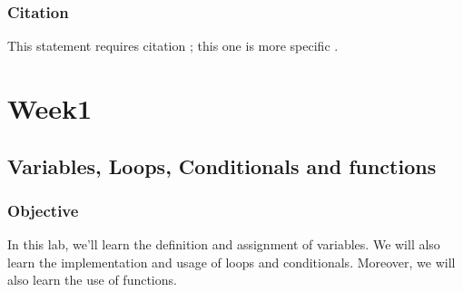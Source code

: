 \documentclass[11pt,fleqn]{book} %
\begin{document}


\pagestyle{empty} %

\tableofcontents %

\cleardoublepage %
\lipsum[1-7] %


\section{Citation}

This statement requires citation \cite{article_key}; this one is more specific \cite[162]{book_key}.


\pagestyle{fancy} %


\part{Week1}



\chapter{Variables, Loops, Conditionals and functions}

\section{Objective}
In this lab, we'll learn the definition and assignment of variables. We will also learn the implementation and usage of loops and conditionals.
Moreover, we will also learn the use of functions.
\end{document}
